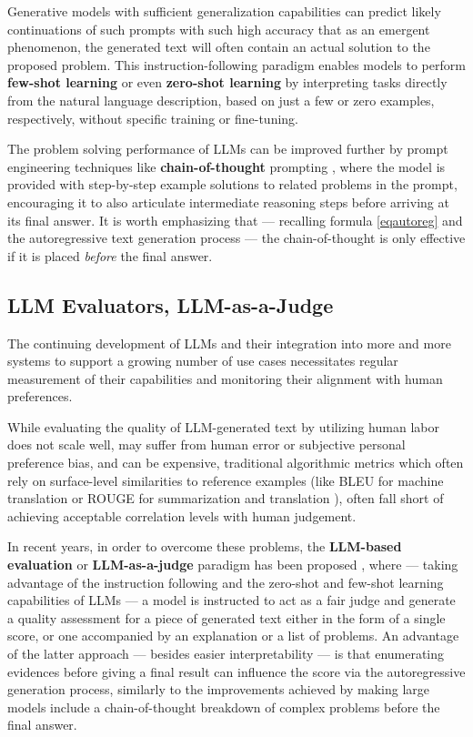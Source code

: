 \documentclass[noindent,nohyp,parspace,titlepage,twoside,12pt]{article}
\begin{document}
      Generative models with sufficient generalization capabilities can predict
      likely continuations of such prompts with such high accuracy that as an
      emergent phenomenon, the generated text will often contain an actual
      solution to the proposed problem. This instruction-following paradigm
      enables models to perform \textbf{few-shot learning} \cite{gpt3} or even
      \textbf{zero-shot learning} by interpreting tasks directly from the
      natural language description, based on just a few or zero examples,
      respectively, without specific training or fine-tuning.

      The problem solving performance of LLMs can be improved further by
      prompt engineering techniques like \textbf{chain-of-thought} prompting
      \cite{cot}, where the model is provided with step-by-step example
      solutions to related problems in the prompt, encouraging it to also
      articulate intermediate reasoning steps before arriving at its final
      answer. It is worth emphasizing that --- recalling formula
      \ref{eqautoreg} and the autoregressive text generation process --- the
      chain-of-thought is only effective if it is placed \emph{before} the
      final answer.

    \subsection{LLM Evaluators, LLM-as-a-Judge}

      The continuing development of LLMs and their integration into more and
      more systems to support a growing number of use cases necessitates regular
      measurement of their capabilities and monitoring their alignment with
      human preferences.

      While evaluating the quality of LLM-generated text by utilizing human
      labor does not scale well, may suffer from human error or subjective
      personal preference bias, and can be expensive, traditional algorithmic
      metrics which often rely on surface-level similarities to reference
      examples (like BLEU for machine translation \cite{bleu} or ROUGE for
      summarization and translation \cite{rouge}), often fall short of achieving
      acceptable correlation levels with human judgement.

      In recent years, in order to overcome these problems, the
      \textbf{LLM-based evaluation} or \textbf{LLM-as-a-judge} paradigm has
      been proposed \cite{gptscore,chatgptgoodeval,reffree,geval},
      where --- taking advantage of the instruction following and the zero-shot
      and few-shot learning capabilities of LLMs --- a model is instructed to
      act as a fair judge and generate a quality assessment for a piece of
      generated text either in the form of a single score, or one accompanied by
      an explanation or a list of problems. An advantage of the latter approach
      --- besides easier interpretability --- is that enumerating evidences
      before giving a final result can influence the score via the
      autoregressive generation process, similarly to the improvements achieved
      by making large models include a chain-of-thought \cite{cot} breakdown of
      complex problems before the final answer.
\end{document}
